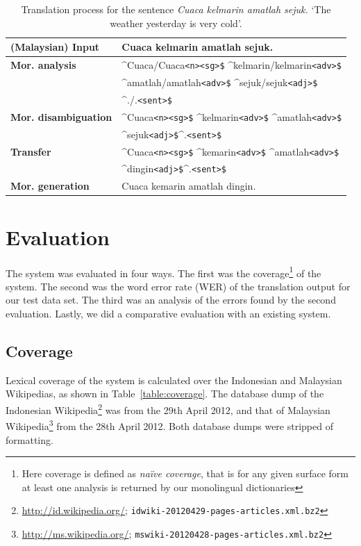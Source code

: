 \documentclass[10pt,a5paper,twoside]{article}
\newcommand{\tag}[1]{{\small{\texttt{#1}}}}
\begin{document}
\begin{table}[htbp]
\centering
\begin{tabular}{ll}
\toprule
{\bf (Malaysian) Input} & Cuaca kelmarin amatlah sejuk. \\ 
\midrule
{\bf Mor. analysis} & \^{}Cuaca/Cuaca\tag{<n>}\tag{<sg>\$} \^{}kelmarin/kelmarin\tag{<adv>\$}\\
~ & \^{}amatlah/amatlah\tag{<adv>\$} \^{}sejuk/sejuk\tag{<adj>\$}\\
~ & \^{}./.\tag{<sent>\$}\\
\midrule
{\bf Mor. disambiguation}& \^{}Cuaca\tag{<n>}\tag{<sg>\$} \^{}kelmarin\tag{<adv>\$} \^{}amatlah\tag{<adv>\$}\\
~ & \^{}sejuk\tag{<adj>\$}\^{}.\tag{<sent>\$} \\
\midrule
{\bf Transfer}& \^{}Cuaca\tag{<n>}\tag{<sg>\$} \^{}kemarin\tag{<adv>\$} \^{}amatlah\tag{<adv>\$}\\
~ & \^{}dingin\tag{<adj>\$}\^{}.\tag{<sent>\$} \\ 
\midrule
{\bf Mor. generation} & Cuaca kemarin amatlah dingin. \\
\bottomrule
\end{tabular}
 \caption{Translation process for the sentence \emph{Cuaca kelmarin amatlah sejuk.} `The weather yesterday is very cold'.}
\end{table}

\section{Evaluation}
\label{sec:eval}
The system was evaluated in four ways. The first was the coverage\footnote{Here coverage is defined as \emph{na\"ive coverage}, that is for any given surface form at least one analysis is returned by our monolingual dictionaries} of the system. The second was the word error rate (WER) of the translation output for our test data set. The third was an analysis of the errors found by the second evaluation. Lastly, we did a comparative evaluation with an existing system.

\subsection{Coverage}
Lexical coverage of the system is calculated over the Indonesian and Malaysian Wikipedias, as shown in Table~\ref{table:coverage}. The database dump of the Indonesian Wikipedia\footnote{\url{http://id.wikipedia.org/}; \texttt{idwiki-20120429-pages-articles.xml.bz2}} was from the 29th April 2012, and that of Malaysian Wikipedia\footnote{\url{http://ms.wikipedia.org/}; \texttt{mswiki-20120428-pages-articles.xml.bz2}} from the 28th April 2012. Both database dumps were stripped of formatting.
\end{document}
